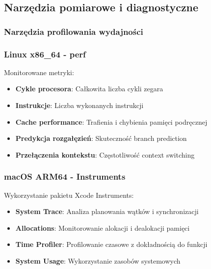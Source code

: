 \subsection{Narzędzia pomiarowe i diagnostyczne}

\subsubsection{Narzędzia profilowania wydajności}

\subsubsection{Linux x86\_64 - perf}
Monitorowane metryki:
\begin{itemize}
    \item \textbf{Cykle procesora}: Całkowita liczba cykli zegara
    \item \textbf{Instrukcje}: Liczba wykonanych instrukcji
    \item \textbf{Cache performance}: Trafienia i chybienia pamięci podręcznej
    \item \textbf{Predykcja rozgałęzień}: Skuteczność branch prediction
    \item \textbf{Przełączenia kontekstu}: Częstotliwość context switching
\end{itemize}

\subsubsection{macOS ARM64 - Instruments}
Wykorzystanie pakietu Xcode Instruments:
\begin{itemize}
    \item \textbf{System Trace}: Analiza planowania wątków i synchronizacji
    \item \textbf{Allocations}: Monitorowanie alokacji i dealokacji pamięci
    \item \textbf{Time Profiler}: Profilowanie czasowe z dokładnością do funkcji
    \item \textbf{System Usage}: Wykorzystanie zasobów systemowych
\end{itemize}